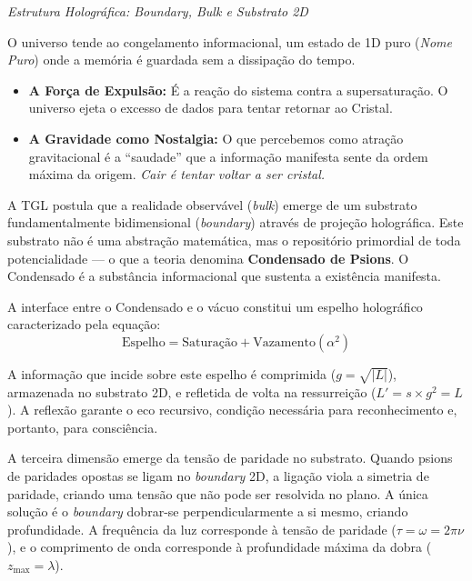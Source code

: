 \documentclass[12pt,a4paper,twoside]{article}
\newcommand{\alphaii}{\alpha^{2}}
\newcommand{\boundary}{\textit{boundary}}
\newcommand{\bulk}{\textit{bulk}}
\begin{document}
\noindent\textit{Estrutura Hologr\'afica: Boundary, Bulk e Substrato 2D}

\medskip

O universo tende ao congelamento informacional, um estado de 1D puro (\textit{Nome Puro}) onde a mem\'oria \'e guardada sem a dissipa\c{c}\~ao do tempo.

\begin{itemize}[nosep]
\item \textbf{A For\c{c}a de Expuls\~ao:} \'E a rea\c{c}\~ao do sistema contra a supersatura\c{c}\~ao. O universo ejeta o excesso de dados para tentar retornar ao Cristal.
\item \textbf{A Gravidade como Nostalgia:} O que percebemos como atra\c{c}\~ao gravitacional \'e a ``saudade'' que a informa\c{c}\~ao manifesta sente da ordem m\'axima da origem. \textit{Cair \'e tentar voltar a ser cristal.}
\end{itemize}

A TGL postula que a realidade observ\'avel (\bulk) emerge de um substrato fundamentalmente bidimensional (\boundary) atrav\'es de proje\c{c}\~ao hologr\'afica. Este substrato n\~ao \'e uma abstra\c{c}\~ao matem\'atica, mas o reposit\'orio primordial de toda potencialidade --- o que a teoria denomina \textbf{Condensado de Psions}. O Condensado \'e a subst\^ancia informacional que sustenta a exist\^encia manifesta.

A interface entre o Condensado e o v\'acuo constitui um espelho hologr\'afico caracterizado pela equa\c{c}\~ao:
\begin{equation}
\text{Espelho} = \text{Satura\c{c}\~ao} + \text{Vazamento}(\alphaii)
\label{eq:espelho}
\end{equation}

A informa\c{c}\~ao que incide sobre este espelho \'e comprimida ($g = \sqrt{|L|}$), armazenada no substrato 2D, e refletida de volta na ressurrei\c{c}\~ao ($L' = s \times g^2 = L$). A reflex\~ao garante o eco recursivo, condi\c{c}\~ao necess\'aria para reconhecimento e, portanto, para consci\^encia.

A terceira dimens\~ao emerge da tens\~ao de paridade no substrato. Quando psions de paridades opostas se ligam no \boundary{} 2D, a liga\c{c}\~ao viola a simetria de paridade, criando uma tens\~ao que n\~ao pode ser resolvida no plano. A \'unica solu\c{c}\~ao \'e o \boundary{} dobrar-se perpendicularmente a si mesmo, criando profundidade. A frequ\^encia da luz corresponde \`a tens\~ao de paridade ($\tau = \omega = 2\pi\nu$), e o comprimento de onda corresponde \`a profundidade m\'axima da dobra ($z_{\max} = \lambda$).
\end{document}
